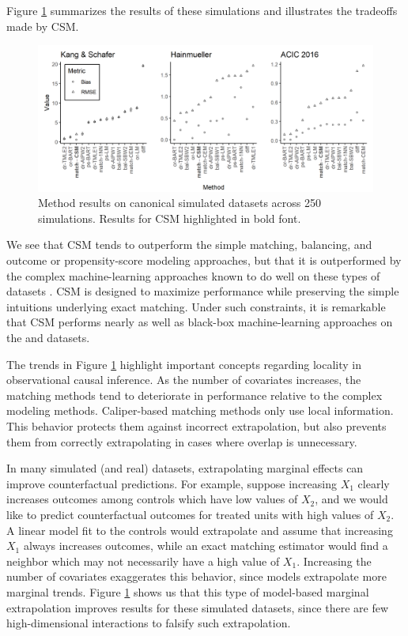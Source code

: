 \documentclass{article}
\begin{document}
Figure \ref{fig:sim_results} summarizes the results of these simulations and illustrates the tradeoffs made by CSM.
\begin{figure}
    \centering
    \includegraphics[width=\textwidth]{writeup/figures/sim_results.png}
    \caption{Method results on canonical simulated datasets across 250 simulations. 
        Results for CSM highlighted in bold font.}
    \label{fig:sim_results}
\end{figure}
We see that CSM tends to outperform the simple matching, balancing, and outcome or propensity-score modeling approaches, but that it is outperformed by the complex machine-learning approaches known to do well on these types of datasets \citep{dorie2019automated}.
CSM is designed to maximize performance while preserving the simple intuitions underlying exact matching.
Under such constraints, it is remarkable that CSM performs nearly as well as black-box machine-learning approaches on the \citet{kang2007demystifying} and \citet{hainmueller2012entropy} datasets.

The trends in Figure \ref{fig:sim_results} highlight important concepts regarding locality in observational causal inference.
As the number of covariates increases, the matching methods tend to deteriorate in performance relative to the complex modeling methods.
Caliper-based matching methods only use local information.
This behavior protects them against incorrect extrapolation, but also prevents them from correctly extrapolating in cases where overlap is unnecessary.

In many simulated (and real) datasets, extrapolating marginal effects can improve counterfactual predictions.
For example, suppose increasing $X_1$ clearly increases outcomes among controls which have low values of $X_2$, and we would like to predict counterfactual outcomes for treated units with high values of $X_2$.
A linear model fit to the controls would extrapolate and assume that increasing $X_1$ always increases outcomes, while an exact matching estimator would find a neighbor which may not necessarily have a high value of $X_1$.
Increasing the number of covariates exaggerates this behavior, since models extrapolate more marginal trends.
Figure \ref{fig:sim_results} shows us that this type of model-based marginal extrapolation improves results for these simulated datasets, since there are few high-dimensional interactions to falsify such extrapolation.
\end{document}
